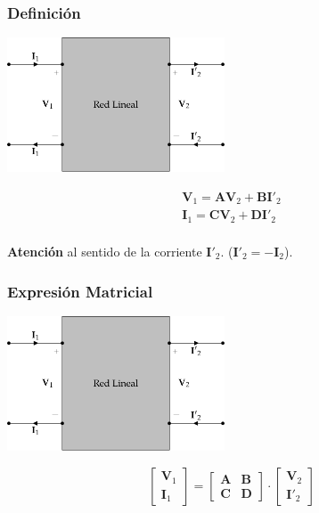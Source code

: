 \subsubsection{Definición}
\label{sec:orgcd755d3}
\begin{center}
\includegraphics[height=4cm]{../figs/cuadripolo_transmision.pdf}
\end{center}

\[
\begin{array}{l}
  \mathbf{V}_1 = \mathbf{A} \mathbf{V}_2 + \mathbf{B}\mathbf{I'}_2\\
  \mathbf{I}_1 = \mathbf{C} \mathbf{V}_2 + \mathbf{D} \mathbf{I'}_2\\
\end{array}
\]

\begin{center}
\textbf{Atención} al sentido de la corriente \(\mathbf{I'}_2\). (\(\mathbf{I'}_2 = - \mathbf{I}_2\)).
\end{center}

\subsubsection{Expresión Matricial}
\label{sec:org104daf9}
\begin{center}
\includegraphics[height=4cm]{../figs/cuadripolo_transmision.pdf}
\end{center}

\[
  \left[
    \begin{array}{c}
      \mathbf{V}_1\\
      \mathbf{I}_1
    \end{array}
  \right] =
  \left[
    \begin{array}{cc}
      \mathbf{A} & \mathbf{B}\\
      \mathbf{C} & \mathbf{D}
    \end{array}
  \right] \cdot
  \left[
    \begin{array}{c}
      \mathbf{V}_2\\
      \mathbf{I'}_2
    \end{array}
  \right]
\]


